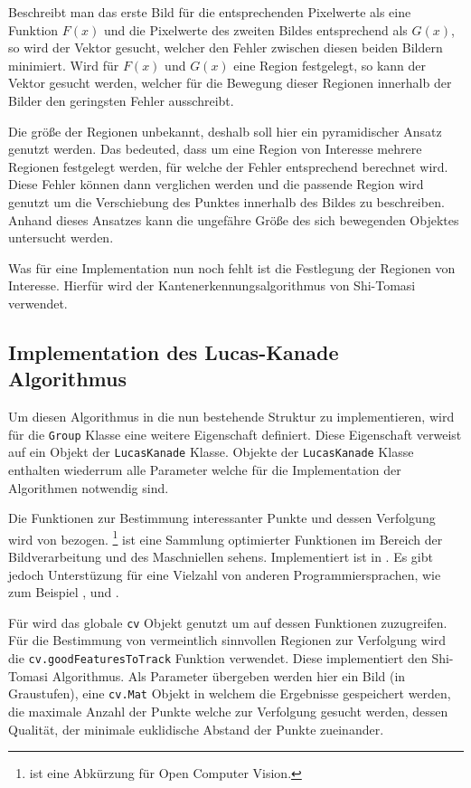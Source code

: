 Beschreibt man das erste Bild für die entsprechenden Pixelwerte als eine Funktion $F(x)$ und die Pixelwerte des zweiten Bildes entsprechend als $G(x)$, so wird der Vektor gesucht, welcher den Fehler zwischen diesen beiden Bildern minimiert.
Wird für $F(x)$ und $G(x)$ eine Region festgelegt, so kann der Vektor gesucht werden, welcher für die Bewegung dieser Regionen innerhalb der Bilder den geringsten Fehler ausschreibt.

Die größe der Regionen unbekannt, deshalb soll hier ein pyramidischer Ansatz genutzt werden.
Das bedeuted, dass um eine Region von Interesse mehrere Regionen festgelegt werden, für welche der Fehler entsprechend berechnet wird.
Diese Fehler können dann verglichen werden und die passende Region wird genutzt um die Verschiebung des Punktes innerhalb des Bildes zu beschreiben.
Anhand dieses Ansatzes kann die ungefähre Größe des sich bewegenden Objektes untersucht werden.

Was für eine Implementation nun noch fehlt ist die Festlegung der Regionen von Interesse.
Hierfür wird der Kantenerkennungsalgorithmus von Shi-Tomasi verwendet.

\subsection{Implementation des Lucas-Kanade Algorithmus}

Um diesen Algorithmus in die nun bestehende Struktur zu implementieren, wird für die \lstinline{Group} Klasse eine weitere Eigenschaft definiert.
Diese Eigenschaft verweist auf ein Objekt der \lstinline{LucasKanade} Klasse.
Objekte der \lstinline{LucasKanade} Klasse enthalten wiederrum alle Parameter welche für die Implementation der Algorithmen notwendig sind.

Die Funktionen zur Bestimmung interessanter Punkte und dessen Verfolgung wird von  bezogen. %
\footnote{ ist eine Abkürzung für Open Computer Vision.} ist eine Sammlung optimierter Funktionen im Bereich der Bildverarbeitung und des Maschniellen sehens.
Implementiert ist  in .
Es gibt jedoch Unterstüzung für eine Vielzahl von anderen Programmiersprachen, wie zum Beispiel ,  und .

Für  wird das globale \lstinline{cv} Objekt genutzt um auf dessen Funktionen zuzugreifen.
Für die Bestimmung von vermeintlich sinnvollen Regionen zur Verfolgung wird die \lstinline{cv.goodFeaturesToTrack} Funktion verwendet.
Diese implementiert den Shi-Tomasi Algorithmus.
Als Parameter übergeben werden hier ein Bild (in Graustufen), eine \lstinline{cv.Mat} Objekt in welchem die Ergebnisse gespeichert werden, die maximale Anzahl der Punkte welche zur Verfolgung gesucht werden, dessen Qualität, %
der minimale euklidische Abstand der Punkte zueinander. %

